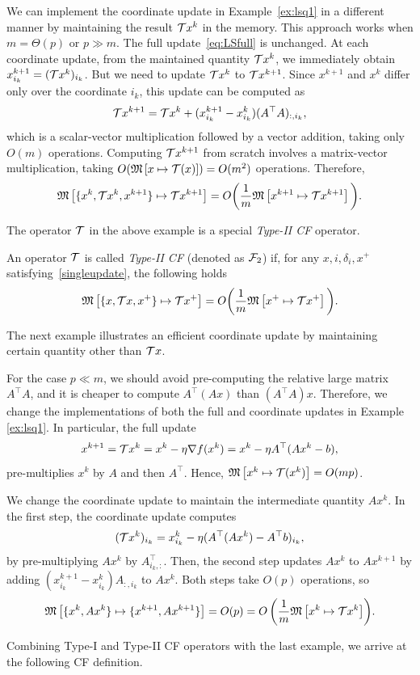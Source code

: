 \begin{example}\label{ex:lsq2}
We can implement the coordinate update in Example~\ref{ex:lsq1} in a different manner by maintaining the result ${\mathcal{T}} x^k$ in the memory. This approach works when $m=\Theta(p)$ or $p\gg m$. The full update~\eqref{eq:LSfull} is unchanged.
At each coordinate update, from the maintained quantity ${\mathcal{T}} x^k$, we immediately obtain $x_{i_k}^{k+1}=({\mathcal{T}} x^k )_{i_k}$. But we need to update ${\mathcal{T}} x^k$ to ${\mathcal{T}} x^{k+1}$.
Since $x^{k+1}$ and $x^k$  differ only over  the coordinate $i_k$, this update can be computed as  
$${\mathcal{T}} x^{k+1} ={\mathcal{T}} x^k + (x^{k+1}_{i_k}-x^k_{i_k})(A^\top A)_{:,i_k},  $$
which is a scalar-vector multiplication followed by a vector addition, taking only $O(m)$ operations. Computing ${\mathcal{T}} x^{k+1}$ from scratch involves  a matrix-vector multiplication, taking $O(\mathfrak{M}\left[{x}\mapsto {{\mathcal{T}}(x)}\right])=O(m^2)$ operations. 
Therefore,
$$\mathfrak{M}\left[{\{ x^k,{\mathcal{T}} x^k, x^{k+1}\}}\mapsto { {\mathcal{T}}x^{k+1}}\right]= O\bigg(\frac{1}{m}  \mathfrak{M}\left[{x^{k+1}}\mapsto {{\mathcal{T}}x^{k+1}}\right] \bigg).$$
\end{example}
The operator ${\mathcal{T}}$ in the above example is a special \emph{Type-II CF} operator.

\begin{definition}[Type-II CF]
An operator ${\mathcal{T}}$ is called \emph{Type-II CF} (denoted as ${\mathcal{F}}_2$) if, for any $x,i,\delta_i,x^+$ satisfying~\eqref{singleupdate}, the following holds
\begin{equation}\label{op-cuf2} \nops{\{ x,\cT x, x^+\}}{ \cT x^+}= O\bigg(\frac{1}{m}\nops{x^+}{\cT x^+}\bigg).
\end{equation}
\end{definition}
The next example illustrates an efficient coordinate update by maintaining certain quantity other than ${\mathcal{T}} x$.
\begin{example}\label{ex:lsq3}
For the case $p\ll m$, we should avoid pre-computing the relative large matrix $A^\top A$, and it is cheaper to compute $A^\top(Ax)$ than $(A^\top A)x$. Therefore, we change the implementations of both the full and coordinate updates in Example \ref{ex:lsq1}. In particular, the full update
$$x^{k+1}={\mathcal{T}} x^k =x^k-\eta\nabla f(x^k)=x^k-\eta A^\top (Ax^k-b),$$
pre-multiplies $x^k$ by $A$ and then $A^\top$. Hence,
$\mathfrak{M}\left[{x^k}\mapsto {{\mathcal{T}}(x^k)}\right]=O(mp)$.

We change the coordinate update to maintain the intermediate quantity $Ax^k$. In the first step, the coordinate update computes
$$({\mathcal{T}} x^k)_{i_k}=x^k_{i_k}-\eta (A^\top (Ax^k)-A^\top b)_{i_k},$$
by pre-multiplying $Ax^k$ by $A^{\top}_{i_k,:}$. Then, the second step updates $Ax^k$ to $Ax^{k+1}$ by adding $(x^{k+1}_{i_k}-x^k_{i_k}) A_{:,i_k}$ to $A x^k$. Both steps take $O(p)$ operations, so
\begin{displaymath}{\nops{\{x^k,Ax^k\}}{\{x^{k+1},Ax^{k+1}\}}=O(p)=O\left(\frac{1}{m}\nops{x^k}{\cT x^k}\right)}.\end{displaymath}
\end{example}
Combining Type-I and Type-II CF operators with the last example, we arrive at the following CF definition.

